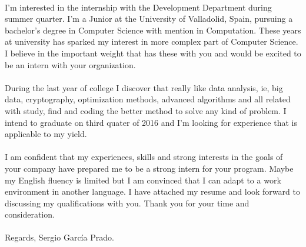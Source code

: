 \documentclass[]{friggeri-cv} %
\begin{document}
    \paragraph{}
    I'm interested in the internship with the Development Department during summer quarter. I'm a Junior at the University of Valladolid, Spain, pursuing a bachelor's degree in Computer Science with mention in Computation. These years at university has sparked my interest in more complex part of Computer Science. I believe in the important weight that has these with you and would be excited to be an intern with your organization.

    \paragraph{}
    During the last year of college I discover that really like data analysis, ie, big data, cryptography, optimization methods, advanced algorithms and all related with study, find and coding the better method to solve any kind of problem. I intend to graduate on third quater of 2016 and I'm looking for experience that is applicable to my yield.

    \paragraph{}
    I am confident that my experiences, skills and strong interests in the goals of your company have prepared me to be a strong intern for your program. Maybe my English fluency is limited but I am convinced that I can adapt to a work environment in another language. I have attached my resume and look forward to discussing my qualifications with you. Thank you for your time and consideration.


    \paragraph{}
    \noindent Regards,
    \newline
    Sergio García Prado.
\end{document}
